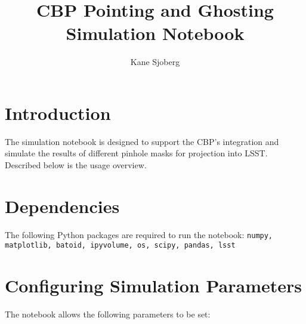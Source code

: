 \documentclass[SE,authoryear,toc]{lsstdoc}
\title{CBP Pointing and Ghosting Simulation Notebook}
\author{%
Kane Sjoberg
}
\date{\vcsDate}
\begin{document}
\maketitle
\mkshorttitle


\section{Introduction}
The simulation notebook is designed to support the CBP's integration and simulate the results of different pinhole masks for projection into LSST. Described below is the usage overview. 

\section{Dependencies}
The following Python packages are required to run the notebook: \texttt{numpy, matplotlib, batoid, ipyvolume, os, scipy, pandas, lsst}

\section{Configuring Simulation Parameters}
The notebook allows the following parameters to be set:
\end{document}
